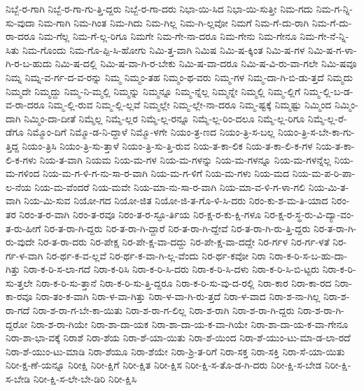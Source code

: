 {ನಿಬ್ಬೆ-ರ-ಗಾಗಿ
ನಿಬ್ಬೆ-ರ-ಗಾ-ಗು-ತ್ತಿ-ದ್ದರು
ನಿಬ್ಬೆ-ರ-ಗಾ-ದರು
ನಿಭಾ-ಯಿ-ಸಿದ
ನಿಭಾ-ಯಿ-ಸುತ್ತೀ
ನಿಮ-ಗದು
ನಿಮ-ಗ-ನ್ನಿ-ಸು-ವುದಾ
ನಿಮ-ಗಾಗಿ
ನಿಮ-ಗಿಂತ
ನಿಮ-ಗಿದು
ನಿಮ-ಗಿಲ್ಲ
ನಿಮ-ಗಿ-ಲ್ಲವೋ
ನಿಮಗೆ
ನಿಮ-ಗೆ-ದು-ರಾಗಿ
ನಿಮ-ಗೆ-ದು-ರಾ-ದರೂ
ನಿಮ-ಗೆಲ್ಲ
ನಿಮ-ಗೆ-ಲ್ಲ-ರಿಗೂ
ನಿಮಗೇ
ನಿಮ-ಗೇ-ನಾ-ದರೂ
ನಿಮ-ಗೇನು
ನಿಮ-ಗೇನೂ
ನಿಮ-ಗೇ-ನೆ-ನ್ನಿ-ಸಿತು
ನಿಮ-ಗೊಂದು
ನಿಮ-ಗೊ-ಪ್ಪಿ-ಸಿ-ಹೋಗು
ನಿಮಿ-ತ್ತ-ವಾಗಿ
ನಿಮಿಷ
ನಿಮಿ-ಷ-ಕ್ಕಿಂತ
ನಿಮಿ-ಷ-ಗಳ
ನಿಮಿ-ಷ-ಗ-ಳಾ-ಗಿ-ರ-ಬ-ಹುದು
ನಿಮಿ-ಷ-ದಲ್ಲಿ
ನಿಮಿ-ಷ-ವಾ-ಗಿ-ರ-ಬೇಕು
ನಿಮಿ-ಷ-ವಾ-ದರೂ
ನಿಮಿ-ಷ-ವಿ-ರು-ವಾ-ಗಲೇ
ನಿಮಿ-ಷವೂ
ನಿಮ್ನ
ನಿಮ್ನ-ವ-ರ್ಗ-ದ-ವ-ರನ್ನು
ನಿಮ್ಮ
ನಿಮ್ಮಂ-ತಹ
ನಿಮ್ಮಂ-ಥ-ವರು
ನಿಮ್ಮ-ಗಳ
ನಿಮ್ಮ-ದಾ-ಗಿ-ಬಿ-ಡು-ತ್ತದೆ
ನಿಮ್ಮದು
ನಿಮ್ಮದೇ
ನಿಮ್ಮದ್ದು
ನಿಮ್ಮ-ನಿ-ಮ್ಮಲ್ಲಿ
ನಿಮ್ಮನ್ನು
ನಿಮ್ಮನ್ನೂ
ನಿಮ್ಮ-ನ್ನೆಲ್ಲ
ನಿಮ್ಮನ್ನೇ
ನಿಮ್ಮಲ್ಲಿ
ನಿಮ್ಮ-ಲ್ಲಿಗೆ
ನಿಮ್ಮ-ಲ್ಲಿ-ಬ-ಡ-ವ-ರಾ-ದರೂ
ನಿಮ್ಮ-ಲ್ಲಿ-ರುವ
ನಿಮ್ಮ-ಲ್ಲಿ-ಲ್ಲವೆ
ನಿಮ್ಮಲ್ಲೇ
ನಿಮ್ಮ-ಲ್ಲೇ-ನಾ-ದರೂ
ನಿಮ್ಮ-ಷ್ಟಕ್ಕೆ
ನಿಮ್ಮಷ್ಟು
ನಿಮ್ಮಿಂದ
ನಿಮ್ಮಿಂ-ದಾಗಿ
ನಿಮ್ಮಿಂ-ದಾ-ದೀತೆ
ನಿಮ್ಮೆಲ್ಲ
ನಿಮ್ಮೆ-ಲ್ಲರ
ನಿಮ್ಮೆ-ಲ್ಲ-ರನ್ನೂ
ನಿಮ್ಮೆ-ಲ್ಲ-ರಿಂ-ದಲೂ
ನಿಮ್ಮೆ-ಲ್ಲ-ರಿಗೂ
ನಿಮ್ಮೆ-ಲ್ಲ-ರೆ-ಡೆಗೂ
ನಿಮ್ಮೊಂ-ದಿಗೆ
ನಿಮ್ಮೊ-ಡ-ನಿ-ದ್ದಾಳೆ
ನಿಮ್ಮೊ-ಳಗೇ
ನಿಯಂ-ತ್ರ-ಣದ
ನಿಯಂ-ತ್ರಿ-ಸ-ಬಲ್ಲ
ನಿಯಂ-ತ್ರಿ-ಸ-ಬೇ-ಕಾ-ಗು-ತ್ತಿದ್ದ
ನಿಯಂ-ತ್ರಿಸಿ
ನಿಯಂ-ತ್ರಿ-ಸು-ತ್ತಾಳೆ
ನಿಯಂ-ತ್ರಿ-ಸು-ತ್ತಿ-ರುವ
ನಿಯ-ತ-ಕಾ-ಲಿಕ
ನಿಯ-ತ-ಕಾ-ಲಿ-ಕ-ಗಳ
ನಿಯ-ತ-ಕಾ-ಲಿ-ಕ-ಗಳು
ನಿಯ-ತ-ವಾಗಿ
ನಿಯಮ
ನಿಯ-ಮ-ಗಳ
ನಿಯ-ಮ-ಗಳನ್ನು
ನಿಯ-ಮ-ಗಳನ್ನೂ
ನಿಯ-ಮ-ಗಳನ್ನೆಲ್ಲ
ನಿಯ-ಮ-ಗಳಿಂದ
ನಿಯ-ಮ-ಗ-ಳಿ-ಗ-ನು-ಸಾ-ರ-ವಾಗಿ
ನಿಯ-ಮ-ಗ-ಳಿಗೆ
ನಿಯ-ಮ-ಗಳು
ನಿಯ-ಮದ
ನಿಯ-ಮ-ಪ-ರಿ-ಪಾ-ಲ-ನೆಯ
ನಿಯ-ಮ-ವೆಂದರೆ
ನಿಯ-ಮವೇ
ನಿಯ-ಮಾ-ನು-ಸಾ-ರ-ವಾಗಿ
ನಿಯ-ಮಾ-ವ-ಳಿ-ಗ-ಳಾ-ಗಲಿ
ನಿಯ-ಮಿ-ತ-ವಾಗಿ
ನಿಯ-ಮಿ-ಸುವ
ನಿಯೋ-ಗದ
ನಿಯೋ-ಜಿತ
ನಿಯೋ-ಜಿ-ತ-ಗೊ-ಳಿ-ಸಿ-ದರು
ನಿರಂ-ಕು-ಶ-ಮ-ತಿ-ಯಾದ
ನಿರಂ-ತರ
ನಿರಂ-ತ-ರ-ವಾಗಿ
ನಿರಂ-ತ-ರವೂ
ನಿರಂ-ತ-ರ-ಸ್ಫೂ-ರ್ತಿಯ
ನಿರ-ಕ್ಷ-ರ-ಕು-ಕ್ಷಿ-ಗಳೂ
ನಿರ-ಕ್ಷ-ರ-ಸ್ಥ-ರು-ವಿ-ದ್ಯಾ-ವಂ-ತ-ರು-ಹೀಗೆ
ನಿರ-ತ-ರಾ-ಗಿ-ದ್ದರು
ನಿರ-ತ-ರಾ-ಗಿ-ದ್ದಾರೆ
ನಿರ-ತ-ರಾ-ಗಿ-ದ್ದೇವೆ
ನಿರ-ತ-ರಾ-ಗಿ-ರು-ತ್ತಿ-ದ್ದರು
ನಿರ-ತ-ರಾ-ಗಿ-ರು-ವುದೇ
ನಿರ-ತ-ರಾ-ದರು
ನಿರ-ಪೇಕ್ಷ
ನಿರ-ಪೇ-ಕ್ಷ-ವಾ-ದದ್ದು
ನಿರ-ಪೇ-ಕ್ಷ-ವಾ-ದದ್ದೇ
ನಿರ-ರ್ಗಳ
ನಿರ-ರ್ಗ-ಳತೆ
ನಿರ-ರ್ಗ-ಳ-ವಾಗಿ
ನಿರ-ರ್ಥ-ಕ-ವ-ಲ್ಲವೆ
ನಿರ-ರ್ಥ-ಕ-ವಾ-ಗಿ-ಲ್ಲ-ವೆಂದು
ನಿರ-ರ್ಥ-ಕವೋ
ನಿರಾ
ನಿರಾ-ಕ-ರಿ-ಸ-ಬ-ಹು-ದಾ-ಗಿತ್ತು
ನಿರಾ-ಕ-ರಿ-ಸ-ಲಾ-ಗದೆ
ನಿರಾ-ಕ-ರಿಸಿ
ನಿರಾ-ಕ-ರಿ-ಸಿ-ದರು
ನಿರಾ-ಕ-ರಿ-ಸಿ-ದಳು
ನಿರಾ-ಕ-ರಿ-ಸಿ-ಬಿ-ಟ್ಟರು
ನಿರಾ-ಕ-ರಿ-ಸು-ತ್ತಲೇ
ನಿರಾ-ಕ-ರಿ-ಸು-ತ್ತಾನೆ
ನಿರಾ-ಕ-ರಿ-ಸು-ತ್ತಿ-ದ್ದರೂ
ನಿರಾ-ಕ-ರಿ-ಸು-ವು-ದ-ರಲ್ಲಿ
ನಿರಾ-ಕಾರ
ನಿರಾ-ಕಾ-ರದ
ನಿರಾ-ಕಾ-ರವೂ
ನಿರಾ-ತಂ-ಕ-ವಾಗಿ
ನಿರಾ-ಳ-ವಾ-ಗಿತ್ತು
ನಿರಾ-ಳ-ವಾ-ಗಿ-ರು-ತ್ತದೆ
ನಿರಾ-ಳ-ವಾದ
ನಿರಾ-ಶ-ನಾ-ಗಿಲ್ಲ
ನಿರಾ-ಶ-ರಾ-ಗದೆ
ನಿರಾ-ಶ-ರಾ-ಗ-ಬೇ-ಕಾ-ಯಿತು
ನಿರಾ-ಶ-ರಾ-ಗ-ಲಿಲ್ಲ
ನಿರಾ-ಶ-ರಾಗಿ
ನಿರಾ-ಶ-ರಾ-ಗಿ-ದ್ದರು
ನಿರಾ-ಶ-ರಾ-ಗಿ-ದ್ದರೋ
ನಿರಾ-ಶ-ರಾ-ಗಿಯೇ
ನಿರಾ-ಶಾ-ದಾ-ಯಕ
ನಿರಾ-ಶಾ-ದಾ-ಯ-ಕ-ವಾ-ಗಿಯೇ
ನಿರಾ-ಶಾ-ದಾ-ಯ-ಕ-ವಾ-ಗೇನೂ
ನಿರಾ-ಶಾ-ಭಾ-ವಕ್ಕೆ
ನಿರಾಶೆ
ನಿರಾ-ಶೆಯ
ನಿರಾ-ಶೆ-ಯಾ-ಯಿತು
ನಿರಾ-ಶೆ-ಯಿಂದ
ನಿರಾ-ಶೆ-ಯುಂ-ಟು-ಮಾ-ಡ-ಲಾ-ರದೆ
ನಿರಾ-ಶೆ-ಯುಂ-ಟು-ಮಾಡಿ
ನಿರಾ-ಶೆಯೂ
ನಿರಾ-ಶೆಯೇ
ನಿರಾ-ಶ್ರಿ-ತ-ರಿಗೆ
ನಿರಾ-ಸಕ್ತ
ನಿರಾ-ಸಕ್ತಿ
ನಿರಾ-ಸೆ-ಯಾ-ಯಿತು
ನಿರೀ-ಕ್ಷ-ಣೆ-ಯನ್ನೂ
ನಿರೀಕ್ಷಿ
ನಿರೀ-ಕ್ಷಿಗೆ
ನಿರೀ-ಕ್ಷಿತ
ನಿರೀ-ಕ್ಷಿಸ
ನಿರೀ-ಕ್ಷಿ-ಸ-ತೊ-ಡ-ಗಿ-ದರು
ನಿರೀ-ಕ್ಷಿ-ಸ-ಬೇಡ
ನಿರೀ-ಕ್ಷಿ-ಸ-ಬೇಡಿ
ನಿರೀ-ಕ್ಷಿ-ಸ-ಲೇ-ಬೇ-ಡಿರಿ
ನಿರೀ-ಕ್ಷಿಸಿ
}
